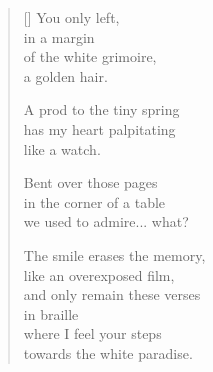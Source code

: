 \documentclass[twocolumn,12pt]{article}
\begin{document}
\begin{verse}[\versewidth]
  You only left, \\
  in a margin \\
  of the white grimoire, \\
  a golden hair.

  A prod to the tiny spring \\
  has my heart palpitating \\
  like a watch.

  Bent over those pages \\
  in the corner of a table \\
  we used to admire... what?

  The smile erases the memory, \\
  like an overexposed film, \\
  and only remain these verses \\
  in braille \\
  where I feel your steps \\
  towards the white paradise.
\end{verse}
\end{document}
